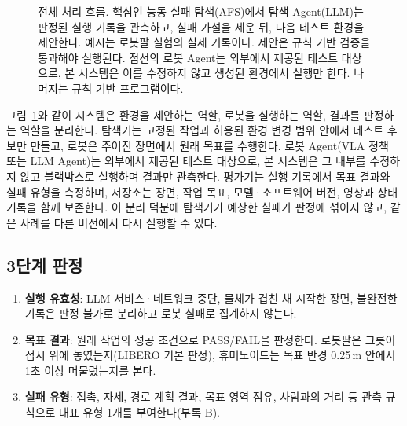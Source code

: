 \begin{figure}[!t]
\caption{전체 처리 흐름. 핵심인 능동 실패 탐색(AFS)에서 탐색 Agent(LLM)는 판정된 실행 기록을 관측하고, 실패 가설을 세운 뒤, 다음 테스트 환경을 제안한다. 예시는 로봇팔 실험의 실제 기록이다. 제안은 규칙 기반 검증을 통과해야 실행된다. 점선의 로봇 Agent는 외부에서 제공된 테스트 대상으로, 본 시스템은 이를 수정하지 않고 생성된 환경에서 실행만 한다. 나머지는 규칙 기반 프로그램이다.}\label{fig:arch}
\end{figure}

그림~\ref{fig:arch}와 같이 시스템은 환경을 제안하는 역할, 로봇을 실행하는 역할, 결과를 판정하는 역할을 분리한다.
탐색기는 고정된 작업과 허용된 환경 변경 범위 안에서 테스트 후보만 만들고, 로봇은 주어진 장면에서
원래 목표를 수행한다. 로봇 Agent(VLA 정책 또는 LLM Agent)는 외부에서 제공된 테스트 대상으로,
본 시스템은 그 내부를 수정하지 않고 블랙박스로 실행하며 결과만 관측한다. 평가기는 실행 기록에서 목표 결과와 실패 유형을 측정하며, 저장소는 장면,
작업 목표, 모델·소프트웨어 버전, 영상과 상태 기록을 함께 보존한다. 이 분리 덕분에 탐색기가
예상한 실패가 판정에 섞이지 않고, 같은 사례를 다른 버전에서 다시 실행할 수 있다.

\subsection*{3단계 판정}
\begin{enumerate}
\item \textbf{실행 유효성}: LLM 서비스·네트워크 중단, 물체가 겹친 채 시작한 장면, 불완전한 기록은 판정 불가로 분리하고 로봇 실패로 집계하지 않는다.
\item \textbf{목표 결과}: 원래 작업의 성공 조건으로 PASS/FAIL을 판정한다. 로봇팔은 그릇이 접시 위에 놓였는지(LIBERO 기본 판정), 휴머노이드는 목표 반경 0.25\,m 안에서 1초 이상 머물렀는지를 본다.
\item \textbf{실패 유형}: 접촉, 자세, 경로 계획 결과, 목표 영역 점유, 사람과의 거리 등 관측 규칙으로 대표 유형 1개를 부여한다(부록 B).
\end{enumerate}
